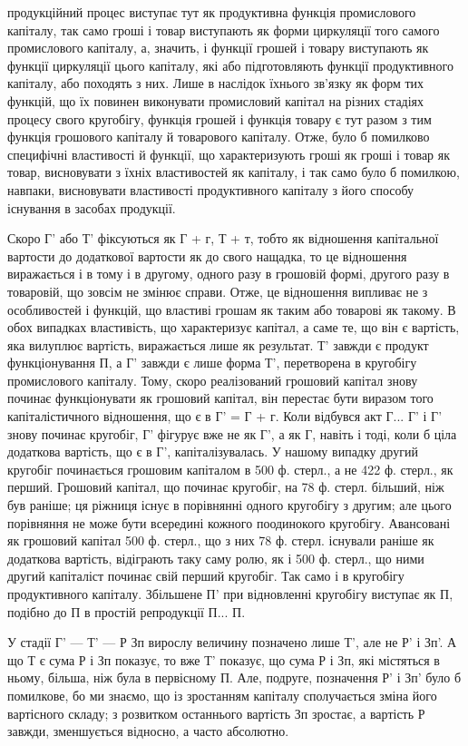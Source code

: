 \parcont{}  %
продукційний процес виступає тут як продуктивна функція промислового
капіталу, так само гроші і товар виступають як форми циркуляції
того самого промислового капіталу, а, значить, і функції грошей і
товару виступають як функції циркуляції цього капіталу, які або
підготовляють функції продуктивного капіталу, або походять з них. Лише
в наслідок їхнього зв’язку як форм тих функцій, що їх повинен виконувати
промисловий капітал на різних стадіях процесу свого кругобігу, функція
грошей і функція товару є тут разом з тим функція грошового капіталу
й товарового капіталу. Отже, було б помилково специфічні властивості
й функції, що характеризують гроші як гроші і товар як товар, висновувати
з їхніх властивостей як капіталу, і так само було б помилкою,
навпаки, висновувати властивості продуктивного капіталу з його способу
існування в засобах продукції.

Скоро Г' або Т' фіксуються як Г + г, Т + т, тобто як відношення
капітальної вартости до додаткової вартости як до свого нащадка, то це
відношення виражається і в тому і в другому, одного разу в грошовій
формі, другого разу в товаровій, що зовсім не змінює справи. Отже, це
відношення випливає не з особливостей і функцій, що властиві грошам
як таким або товарові як такому. В обох випадках властивість, що характеризує
капітал, а саме те, що він є вартість, яка вилуплює вартість, виражається
лише як результат. Т' завжди є продукт функціонування П, а Г' завжди
є лише форма Т', перетворена в кругобігу промислового капіталу. Тому,
скоро реалізований грошовий капітал знову починає функціонувати як
грошовий капітал, він перестає бути виразом того капіталістичного відношення,
що є в Г' = Г + г. Коли відбувся акт Г... Г' і Г' знову починає
кругобіг, Г' фігурує вже не як Г', а як Г, навіть і тоді, коли б ціла
додаткова вартість, що є в Г', капіталізувалась. У нашому випадку другий
кругобіг починається грошовим капіталом в 500 ф. стерл., а не
422 ф. стерл., як перший. Грошовий капітал, що починає кругобіг, на
78 ф. стерл. більший, ніж був раніше; ця ріжниця існує в порівнянні
одного кругобігу з другим; але цього порівняння не може бути всередині
кожного поодинокого кругобігу. Авансовані як грошовий капітал 500 ф.
стерл., що з них 78 ф. стерл. існували раніше як додаткова вартість,
відіграють таку саму ролю, як і 500 ф. стерл., що ними другий капіталіст
починає свій перший кругобіг. Так само і в кругобігу продуктивного
капіталу. Збільшене П' при відновленні кругобігу виступає як П,
подібно до П в простій репродукції П... П.

У стадії Г' — Т' — Р Зп вирослу величину позначено лише Т', але не
Р' і Зп'. А що Т є сума Р і Зп показує, то вже Т' показує, що сума Р і Зп,
 які містяться в ньому, більша, ніж була в первісному П. Але, подруге,
позначення Р' і Зп' було б помилкове, бо ми знаємо, що із зростанням
капіталу сполучається зміна його вартісного складу; з розвитком останнього
вартість Зп зростає, а вартість Р завжди, зменшується відносно, а часто
абсолютно.
